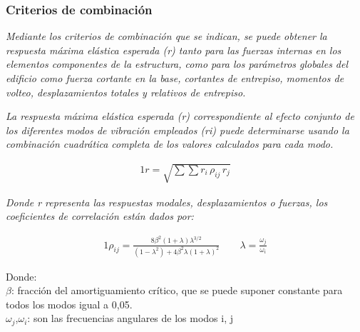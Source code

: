 \documentclass{article}%
\begin{document}
\subsubsection{Criterios de combinación}%
\label{ssubsec:Criteriosdecombinacin}%
\begin{tcolorbox}[colback=gray!5!white,colframe=Maroon!75!black,fonttitle=\bfseries,title=Art. 29.3.1]%
\textit{Mediante los criterios de combinación que se indican, se puede obtener la respuesta máxima elástica esperada (r) tanto para las fuerzas internas en los elementos componentes de la estructura, como para los parámetros globales  del edificio como fuerza cortante en la base, cortantes de entrepiso, momentos  de volteo, desplazamientos totales y relativos de entrepiso.}%
\end{tcolorbox}%
\begin{tcolorbox}[colback=gray!5!white,colframe=Maroon!75!black,fonttitle=\bfseries,title=Art. 29.3.2]%
\textit{La respuesta máxima elástica esperada (r) correspondiente al efecto conjunto  de  los  diferentes  modos  de  vibración  empleados  (ri)  puede determinarse usando la combinación cuadrática completa de los valores calculados para cada modo.}%
\end{tcolorbox}%
\begin{alignat}{1}%
r=\sqrt{\sum \sum r_{i}\,\rho _{ij}\,r_{j}}%
\end{alignat}%
\begin{tcolorbox}[colback=gray!5!white,colframe=Maroon!75!black,fonttitle=\bfseries,title=Art. 29.3.3]%
\textit{Donde r representa las respuestas modales, desplazamientos o fuerzas, los coeficientes de correlación están dados por:}%
\end{tcolorbox}%
\begin{alignat}{1}%
\rho_{ij}=\frac{8\beta ^{2}\left ( 1+\lambda  \right )\lambda ^{3/2}}{\left ( 1-\lambda ^{2} \right )+4\beta ^{2}\lambda \left ( 1+\lambda  \right )^{2}}\quad\quad  \lambda =\frac{\omega _{j}}{\omega _{i}}%
\end{alignat}%
\begin{flushleft}%
Donde:\\%
$\beta$: fracción del amortiguamiento crítico, que se puede suponer constante para todos los modos igual a 0,05.\\%
$\omega _{j}$,$\omega _{i}$: son las frecuencias angulares de los modos i, j\\%
\end{flushleft}

%
\end{document}
